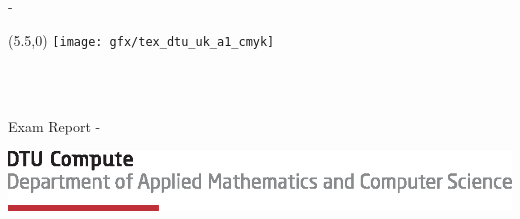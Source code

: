 \begin{titlingpage}
	\thispagestyle{empty}
	\enlargethispage{1.3cm}
	\calccentering{\unitlength}
	\begin{adjustwidth}{\unitlength}{-\unitlength}
		\vspace*{-1.9cm}
		
		\begin{textblock}{6.5}(5.5,0) %
			\texttt{[image: gfx/tex\_dtu\_uk\_a1\_cmyk]}
		\end{textblock}

		\begin{raggedright}
			{\Huge\sffamily\ThAuthors\\[2cm]}
			\begin{Spacing}{1.2}
				{\sffamily\HUGE\textbf{\ThTitleEN}\\[1.5cm]}
				{\sffamily\LARGE{Exam Report - \ThEndDate}\\[2cm]}
			\end{Spacing}
		\end{raggedright}
		\begin{raggedright}
			\includegraphics[width=1.0\textwidth]{gfx/tex_dtu_compute_a_uk}%
		\end{raggedright}
	\end{adjustwidth}

	\cleardoublepage


\end{titlingpage}
